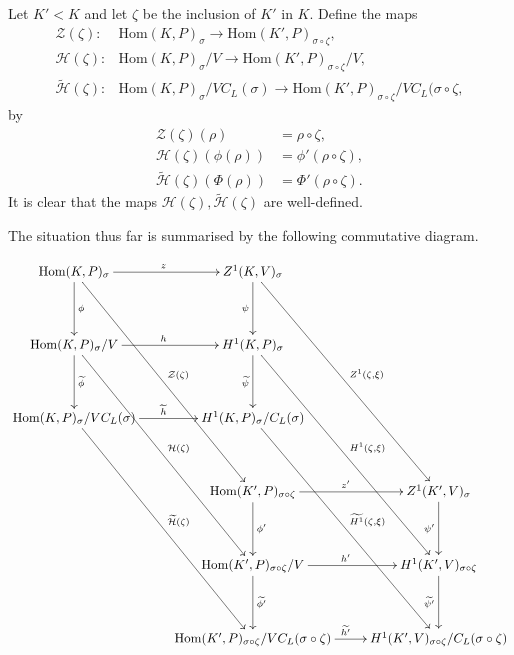 \begin{definition} \label{main_cd} Let $K' < K$ and let $\zeta$ be the inclusion of $K'$ in $K$. Define the maps
	\begin{align*}
		\mathcal{Z}(\zeta):&\mathrm{Hom}(K, P)_\sigma \rightarrow \mathrm{Hom}(K', P)_{\sigma\circ\zeta}, \\
		\mathcal{H}(\zeta):&\mathrm{Hom}(K, P)_\sigma/V \rightarrow \mathrm{Hom}(K', P)_{\sigma\circ\zeta}/V, \\
		\widetilde{\mathcal{H}}(\zeta):&\mathrm{Hom}(K, P)_\sigma/VC_L(\sigma) \rightarrow \mathrm{Hom}(K', P)_{\sigma\circ\zeta}/VC_L(\sigma\circ\zeta,
	\end{align*}
	by
	\begin{align*}
		\mathcal{Z}(\zeta)(\rho) &= \rho\circ\zeta, \\
		\mathcal{H}(\zeta)(\phi(\rho)) &= \phi'(\rho\circ\zeta), \\
		\widetilde{\mathcal{H}}(\zeta)(\Phi(\rho)) &= \Phi'(\rho\circ\zeta).
	\end{align*}
It is clear that the maps $\mathcal{H}(\zeta), \widetilde{\mathcal{H}}(\zeta)$ are well-defined.

The situation thus far is summarised by the following commutative diagram.
\par\nobreak
	{\small
	\setlength{\abovedisplayskip}{6pt}
	\setlength{\belowdisplayskip}{\abovedisplayskip}
	\setlength{\abovedisplayshortskip}{3pt}
	\setlength{\belowdisplayshortskip}{3pt}
	\begin{align*}
		\xymatrix@R=40pt{
			\mathrm{Hom}(K, P)_\sigma \ar[r]^{z} \ar[d]^{\phi} \ar[dddr]^{\mathcal{Z}(\zeta)} & Z^1(K, V)_\sigma \ar[d]_{\psi} \ar[dddr]^{Z^1(\zeta, \xi)} & \\
			\mathrm{Hom}(K, P)_\sigma/V \ar[r]^{h} \ar[d]^{\widetilde{\phi}} \ar[dddr]^{\mathcal{H}(\zeta)} & H^1(K, P)_\sigma \ar[d]_{\widetilde{\psi}} \ar[dddr]^{H^1(\zeta, \xi)} & \\
			\mathrm{Hom}(K, P)_\sigma/VC_L(\sigma) \ar[r]^{\widetilde{h}} \ar[dddr]^{\widetilde{\mathcal{H}}(\zeta)} & H^1(K, P)_\sigma/C_L(\sigma) \ar[dddr]^{\widetilde{H^1}(\zeta, \xi)} & \\
			& \mathrm{Hom}(K', P)_{\sigma\circ\zeta} \ar[r]^{z'} \ar[d]^{\phi'} & Z^1(K', V)_\sigma \ar[d]_{\psi'} \\
			& \mathrm{Hom}(K', P)_{\sigma\circ\zeta}/V \ar[r]^{h'} \ar[d]^{\widetilde{\phi'}} & H^1(K', V)_{\sigma\circ\zeta} \ar[d]_{\widetilde{\psi'}} \\
			& \mathrm{Hom}(K', P)_{\sigma\circ\zeta}/VC_L(\sigma\circ\zeta) \ar[r]^{\widetilde{h'}} & H^1(K', V)_{\sigma\circ\zeta}/C_L(\sigma\circ\zeta) \\
		}
	\end{align*}
	}%
\end{definition}

